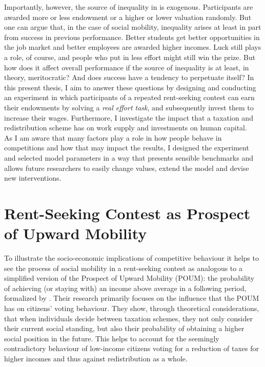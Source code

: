 Importantly, however, the source of inequality in \cite{fallucchi2017} is exogenous. Participants are awarded more or less endowment or a higher or lower valuation randomly. But one can argue that, in the case of social mobility, inequality arises at least in part from success in previous performance. Better students get better opportunities in the job market and better employees are awarded higher incomes. Luck still plays a role, of course, and people who put in less effort might still win the prize. But how does it affect overall performance if the source of inequality is at least, in theory, meritocratic? And does success have a tendency to perpetuate itself? In this present thesis, I aim to answer these questions by designing and conducting an experiment in which participants of a repeated rent-seeking contest can earn their endowments by solving a \textit{real effort task}, and subsequently invest them to increase their wages. Furthermore, I investigate the impact that a taxation and redistribution scheme has on work supply and investments on human capital.\\

As I am aware that many factors play a role in how people behave in competitions and how that may impact the results, I designed the experiment and selected model parameters in a way that presents sensible benchmarks and allows future researchers to easily change values, extend the model and devise new interventions.\\ 

\section{Rent-Seeking Contest as Prospect of Upward Mobility}
\label{sec:poum}
 
To illustrate the socio-economic implications of competitive behaviour it helps to see the process of social mobility in a rent-seeking contest as analogous to a simplified version of the Prospect of Upward Mobility (POUM): the probability of achieving (or staying with) an income above average in a following period, formalized by \cite{benabou2001}. Their research primarily focuses on the influence that the POUM has on citizens' voting behaviour. They show, through theoretical considerations, that when individuals decide between taxation schemes, they not only consider their current social standing, but also their probability of obtaining a higher social position in the future. This helps to account for the seemingly contradictory behaviour of low-income citizens voting for a reduction of taxes for higher incomes and thus against redistribution as a whole.\\


